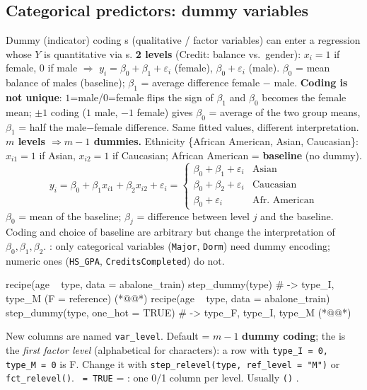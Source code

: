\subsection{Categorical predictors: dummy variables}
\begin{topic}{Dummy (indicator) coding}
 s (qualitative / factor variables) can enter a regression whose $Y$ is quantitative via s.
\textbf{2 levels} (Credit: balance vs.\ gender): $x_i=1$ if female, $0$ if male $\Rightarrow$
$y_i=\beta_0+\beta_1+\varepsilon_i$ (female), $\beta_0+\varepsilon_i$ (male). $\beta_0$ = mean balance of males (baseline); $\beta_1$ = average difference female $-$ male.
\textbf{Coding is not unique}: $1$=male/$0$=female flips the sign of $\beta_1$ and $\beta_0$ becomes the female mean; $\pm1$ coding ($1$ male, $-1$ female) gives $\beta_0$ = average of the two group means, $\beta_1$ = half the male$-$female difference. Same fitted values, different interpretation.
\textbf{$m$ levels $\Rightarrow m-1$ dummies.} Ethnicity \{African American, Asian, Caucasian\}: $x_{i1}=1$ if Asian, $x_{i2}=1$ if Caucasian; African American = \textbf{baseline} (no dummy).
\[ y_i=\beta_0+\beta_1x_{i1}+\beta_2x_{i2}+\varepsilon_i=\begin{cases}\beta_0+\beta_1+\varepsilon_i&\text{Asian}\\ \beta_0+\beta_2+\varepsilon_i&\text{Caucasian}\\ \beta_0+\varepsilon_i&\text{Afr.\ American}\end{cases} \]
$\beta_0$ = mean of the baseline; $\beta_j$ = difference between level $j$ and the baseline. Coding and choice of baseline are arbitrary but change the interpretation of $\beta_0,\beta_1,\beta_2$.
: only categorical variables (\texttt{Major}, \texttt{Dorm}) need dummy encoding; numeric ones (\texttt{HS\_GPA}, \texttt{CreditsCompleted}) do not.
\end{topic}

\begin{keybox}
\begin{rcode}
recipe(age ~ type, data = abalone_train) %
  step_dummy(type)            # -> type_I, type_M  (F = reference)  (*@@*)
recipe(age ~ type, data = abalone_train) %
  step_dummy(type, one_hot = TRUE)  # -> type_F, type_I, type_M  (*@@*)
\end{rcode}
New columns are named \texttt{var\_level}. Default = $m-1$ \textbf{dummy coding}; the  is the \emph{first factor level} (alphabetical for characters): a row with \texttt{type\_I = 0, type\_M = 0} is F. Change it with \texttt{step\_relevel(type, ref\_level = "M")} or \texttt{fct\_relevel()}. \texttt{ = TRUE} = : one 0/1 column per level. Usually \texttt{(}\texttt{)} .
\end{keybox}

